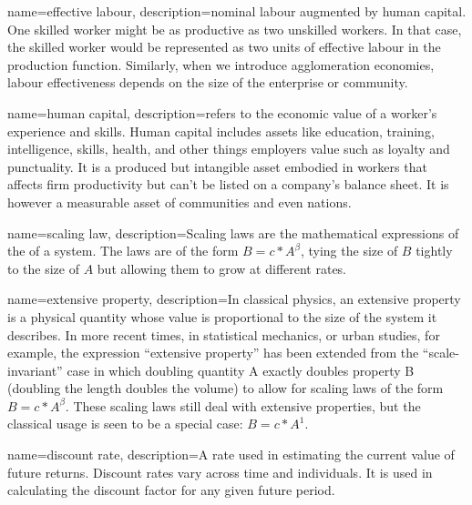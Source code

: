 {
name=effective labour,
description={nominal labour augmented by \gls{human capital}. One skilled worker might be as productive as two unskilled workers. In that case,  the skilled worker would be represented as two units of effective labour in the  \gls{production function}. Similarly, when we introduce \gls{agglomeration} economies, labour effectiveness depends on the size of the enterprise or community.}
}


{
name=human capital,
description={refers to the economic value of a worker's experience and skills. Human capital includes assets like education, training, intelligence, skills, health, and other things employers value such as loyalty and punctuality. It is a produced but intangible asset embodied in workers that affects firm productivity but can't be listed on a company's balance sheet. It is however a measurable asset of communities and even nations.}
}

{
name=scaling law,
description={Scaling laws are the mathematical expressions of the  
of a system. The laws are of the form  $B=c*A^\beta$, tying the size of $B$ tightly to the size of $A$ but allowing them to grow at different rates.}
}

{
name=extensive property,
description={In classical physics, an extensive property is a physical quantity whose value is proportional to the size of the system it describes. In more recent times, in statistical mechanics, or urban studies, for example, the expression ``extensive property'' has been extended from the ``scale-invariant'' case in which doubling quantity A exactly doubles property B (doubling the length doubles the volume) to allow for scaling laws of the form $B=c*A^\beta$. These \glspl{scaling law} still deal with extensive properties, but the classical usage is seen to be a special case: $B=c*A^1$.}
}

{
name=discount rate,
description={A rate used in estimating the current value of future returns. Discount rates vary across time and individuals. It is used in calculating the \gls{discount factor} for any given future period.}
}

